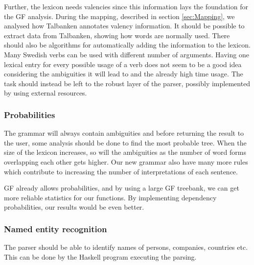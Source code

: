 \documentclass{report}
\begin{document}
Further, the lexicon needs valencies since this information lays the
foundation for the GF analysis. 
During the mapping, described in section \ref{sec:Mapping}, we analysed how Talbanken
annotates valency information. It should be possible to %
extract data from Talbanken,
showing how words are normally used. There should also be algorithms for
automatically adding the information to the lexicon. \\
Many Swedish verbs can be used with different number of arguments.
Having one lexical entry for every possible usage of a verb
does not seem to be a good idea considering
the ambiguities it will lead to and the already high time usage.
The task should instead be left to the robust layer of the parser, possibly
implemented by using external resources.




\subsubsection{Probabilities}
\label{sec:futureProbabilities}
The grammar will always contain ambiguities and before returning the result
to the user, some analysis should be done to find the most probable tree.
When the size of the lexicon
increases, so will the ambiguities as the number of word forms overlapping each other
gets higher. Our new grammar also have many more rules which contribute
to increasing the number of interpretations of each sentence.

GF already allows probabilities, and by using a large
GF treebank, we can get more reliable statistics for our functions. 
By implementing dependency probabilities, our results would be even better.

\subsubsection{Named entity recognition}
The parser should be able to identify names of persons, companies, countries etc.
This can be done by the Haskell program executing the parsing.
\end{document}
